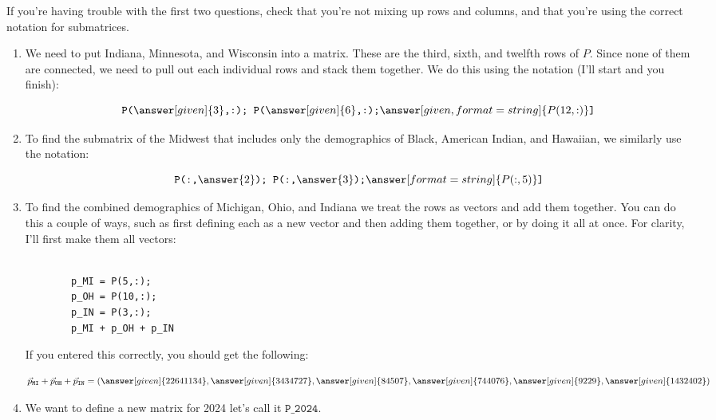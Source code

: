 \documentclass{ximera}
\begin{document}
\begin{exploration}
\begin{example}
\begin{hint}

  If you're having trouble with the first two questions, check that you're not mixing up rows and columns, and that you're using the correct notation for submatrices.

\end{hint}

\begin{solution}
  \begin{enumerate}
  \item We need to put Indiana, Minnesota, and Wisconsin into a matrix. These are the third, sixth, and twelfth rows of $P$. Since none of them are connected, we need to pull out each individual rows and stack them together. We do this using the notation (I'll start and you finish):

    \[
    \texttt{P(}\answer[given]{3}\texttt{,:); P(}\answer[given]{6}\texttt{,:);}\answer[given, format=string]{P(12,:)}\texttt{]} 
    \]
    \item To find the submatrix of the Midwest that includes only the
      demographics of Black, American Indian, and Hawaiian, we similarly use the notation:

      \[
      \texttt{P(:,}\answer{2}\texttt{); P(:,}\answer{3}\texttt{);}\answer[format=string]{P(:,5)}\texttt{]}
      \]
  \item To find the combined demographics of Michigan, Ohio, and
    Indiana we treat the rows as vectors and add them together. You can do this a couple of ways, such as first defining each as a new vector and then adding them together, or by doing it all at once. For clarity, I'll first make them all vectors:

      \begin{Verbatim}
      
        p_MI = P(5,:);
        p_OH = P(10,:);
        p_IN = P(3,:);
        p_MI + p_OH + p_IN

      \end{Verbatim}

      If you entered this correctly, you should get the following:

    \[
    \vec{p}_{\texttt{MI}} + \vec{p}_{\texttt{OH}} + \vec{p}_{\texttt{IN}} = (\answer[given]{22641134},\answer[given]{3434727},\answer[given]{84507},\answer[given]{744076},\answer[given]{9229},\answer[given]{1432402})
    \]
  \item We want to define a new matrix for 2024 let's call it $\texttt{P\_2024}$.
  

\end{enumerate}
\end{solution}
\end{example}
\end{exploration}
\end{document}
